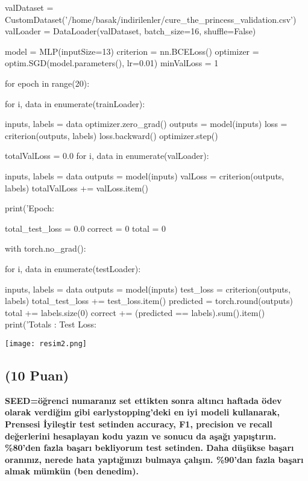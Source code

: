 \documentclass[11pt]{article}
\begin{document}
\begin{python}
valDataset = CustomDataset('/home/basak/indirilenler/cure_the_princess_validation.csv')
valLoader = DataLoader(valDataset, batch_size=16, shuffle=False)

model = MLP(inputSize=13)
criterion = nn.BCELoss()
optimizer = optim.SGD(model.parameters(), lr=0.01)
minValLoss = 1

for epoch in range(20):

    for i, data in enumerate(trainLoader):

        inputs, labels = data
        optimizer.zero_grad()
        outputs = model(inputs)
        loss = criterion(outputs, labels)
        loss.backward()
        optimizer.step()

    totalValLoss = 0.0
    for i, data in enumerate(valLoader):

        inputs, labels = data
        outputs = model(inputs)
        valLoss = criterion(outputs, labels)
        totalValLoss += valLoss.item()

    print('Epoch: %

total_test_loss = 0.0
correct = 0
total = 0

with torch.no_grad():

    for i, data in enumerate(testLoader):

        inputs, labels = data
        outputs = model(inputs)
        test_loss = criterion(outputs, labels)
        total_test_loss += test_loss.item()
        predicted = torch.round(outputs)
        total += labels.size(0)
        correct += (predicted == labels).sum().item()
print('Totals : Test Loss: %

\end{python}
\begin{center}
    \centering
    \texttt{[image: resim2.png]}
    \label{fig:my_pic}
\end{center}


\subsection{(10 Puan)} \textbf{SEED=öğrenci numaranız set ettikten sonra altıncı haftada ödev olarak verdiğim gibi earlystopping'deki en iyi modeli kullanarak, Prensesi İyileştir test setinden accuracy, F1, precision ve recall değerlerini hesaplayan kodu yazın ve sonucu da aşağı yapıştırın. \%80'den fazla başarı bekliyorum test setinden. Daha düşükse başarı oranınız, nerede hata yaptığınızı bulmaya çalışın. \%90'dan fazla başarı almak mümkün (ben denedim).}
\end{document}
